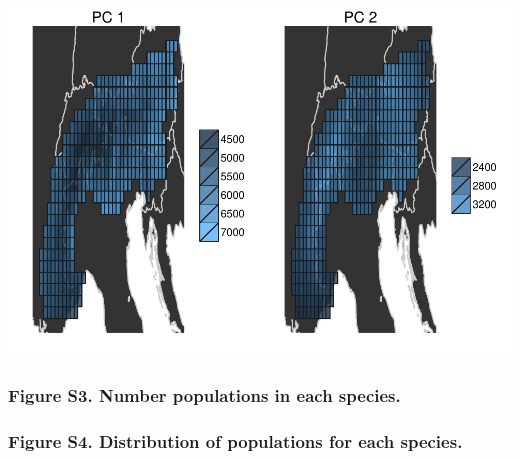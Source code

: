 \documentclass[11pt,]{article}
\let\origfigure\figure
\let\endorigfigure\endfigure
\renewenvironment{figure}[1][2] {
	\expandafter\origfigure\expandafter[H]
} {
	\endorigfigure
}
\begin{document}
\begin{figure}[htbp]
\centering
\includegraphics{article_files/figure-latex/unnamed-chunk-8-1.pdf}
\caption{Climatic variation. Each panel depicts variation based on a
different principle component (PC). Sqaures represent planning units.
The color of each planning unit denotes the average priciniple component
value of pixels inside it. Planning units with more similar colors have
more similar climates regimes.}
\end{figure}

\subsubsection{Figure S3. Number populations in each
species.}\label{figure-s3.-number-populations-in-each-species.}

\subsubsection{Figure S4. Distribution of populations for each
species.}\label{figure-s4.-distribution-of-populations-for-each-species.}
\end{document}
